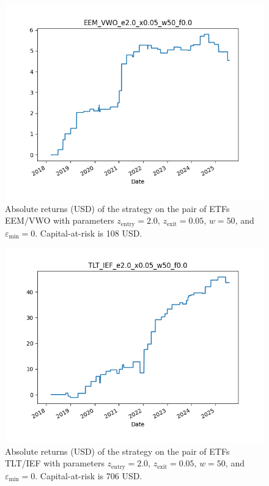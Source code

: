 \documentclass{article}
\begin{document}
\begin{figure}
\centering
\includegraphics[width=0.8\linewidth]{EEM_VWO_e2.0_x0.05_w50_f0.0.png}
\caption{Absolute returns (USD) of the strategy on the pair of ETFs EEM/VWO with parameters $z_{\mathrm{entry}}=2.0$, $z_{\mathrm{exit}}=0.05$, $w=50$, and $\varepsilon_{\min}=0$. Capital-at-risk is 108 USD.}
\end{figure}

\begin{figure}
\centering
\includegraphics[width=0.8\linewidth]{TLT_IEF_e2.0_x0.05_w50_f0.0.png}
\caption{Absolute returns (USD) of the strategy on the pair of ETFs TLT/IEF with parameters $z_{\mathrm{entry}}=2.0$, $z_{\mathrm{exit}}=0.05$, $w=50$, and $\varepsilon_{\min}=0$. Capital-at-risk is 706 USD.}
\end{figure}

\clearpage
\printbibliography
\end{document}
